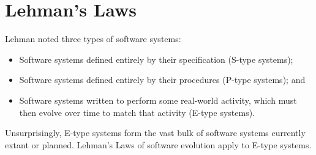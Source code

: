 % 
% 

\begin{appendices}

\label{app:LehmansLaws}
\chapter{Lehman's Laws}

Lehman noted three types of software systems:

\begin{itemize}
\item Software systems defined entirely by their specification (S-type systems);
\item Software systems defined entirely by their procedures (P-type systems); and
\item Software systems written to perform some real-world activity, which must then evolve over time to match that activity (E-type systems).
\end{itemize}

Unsurprisingly, E-type systems form the vast bulk of software systems currently extant or planned. Lehman's Laws of software evolution apply to E-type systems.


\end{appendices}
